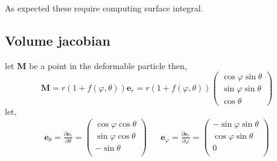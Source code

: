 As expected these require computing surface integral. 



\subsection{Volume jacobian}

let \textbf{M} be a point in the deformable particle then, 
\begin{equation}
    \textbf{M}
    =
    r(1+f(\varphi,\theta))\textbf{e}_r
    =
    r(1+f(\varphi,\theta))\begin{pmatrix}
        \cos\varphi \sin\theta\\
        \sin\varphi \sin\theta\\
        \cos\theta
    \end{pmatrix}
\end{equation}
let,
\begin{align}
    \textbf{e}_{\theta}
    =
    \frac{\partial \textbf{e}_r}{\partial \theta}
    = 
    \begin{pmatrix}
        \cos \varphi \cos\theta\\
        \sin \varphi \cos\theta\\
        -\sin\theta\\
    \end{pmatrix}
    &&
    \textbf{e}_{\varphi}
    =
    \frac{\partial \textbf{e}_r}{\partial \varphi}
    = 
    \begin{pmatrix}
        -\sin \varphi \sin\theta\\
        \cos \varphi \sin\theta\\
        0\\
    \end{pmatrix}\\
\end{align}

